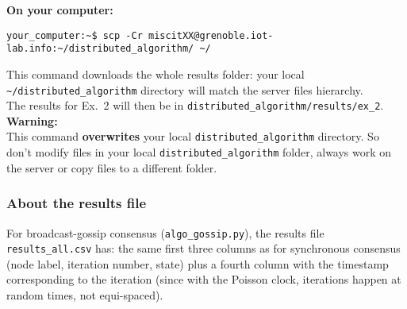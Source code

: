 \documentclass[oneside]{article}
\begin{document}
\textbf{On your computer:} 
\begin{verbatim}
your_computer:~$ scp -Cr miscitXX@grenoble.iot-lab.info:~/distributed_algorithm/ ~/
\end{verbatim}
This command downloads the whole results folder:
your local \verb=~/distributed_algorithm= directory will match the server files hierarchy.\\
The results for Ex.~2 will then be in \verb=distributed_algorithm/results/ex_2=.\\
\textbf{Warning:} \\ This command \textbf{overwrites} your local \verb=distributed_algorithm= directory. So don't modify files in your local \verb=distributed_algorithm= folder, always work on the server or copy files to a different folder.

\subsubsection{About the results file} %

For broadcast-gossip consensus (\verb=algo_gossip.py=), the results file
\verb=results_all.csv= has:
the same first three columns as for synchronous consensus (node label, 
iteration number, state)
plus a fourth column with the timestamp corresponding to the iteration (since with the Poisson clock, iterations happen at random times, not equi-spaced).
\end{document}
